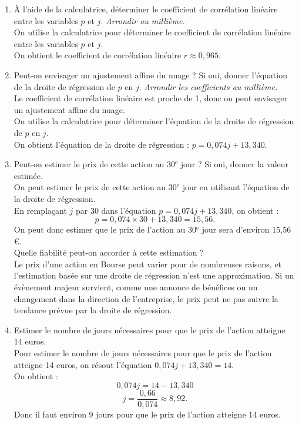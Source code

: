 \documentclass[a4paper,11pt,exos]{nsi}
\begin{document}
\begin{enumerate}
    \item À l'aide de la calculatrice, déterminer le coefficient de corrélation linéaire entre les variables $p$ et $j$. \textit{Arrondir au millième.}\\[.5em]
    \textcolor{UGLiBlue}{
        On utilise la calculatrice pour déterminer le coefficient de corrélation linéaire entre les variables $p$ et $j$.\\
        On obtient le coefficient de corrélation linéaire $r\approx 0,965$.
    }
    \item Peut-on envisager un ajustement affine du nuage ? Si oui, donner l'équation de la droite de régression de $p$ en $j$. \textit{Arrondir les coefficients au millième.}\\[.5em]
    \textcolor{UGLiBlue}{
        Le coefficient de corrélation linéaire est proche de 1, donc on peut envisager un ajustement affine du nuage.\\
        On utilise la calculatrice pour déterminer l'équation de la droite de régression de $p$ en $j$.\\
        On obtient l'équation de la droite de régression : $p = 0,074j + 13,340$.
    }
    \item Peut-on estimer le prix de cette action au 30$^{\text{e}}$ jour ? Si oui, donner la valeur estimée.\\[.5em]
    \textcolor{UGLiBlue}{
        On peut estimer le prix de cette action au 30$^{\text{e}}$ jour en utilisant l'équation de la droite de régression.\\
        En remplaçant $j$ par 30 dans l'équation $p = 0,074j + 13,340$, on obtient :
        \[p = 0,074 \times 30 + 13,340 = 15,56.\]
        On peut donc estimer que le prix de l'action au 30$^{\text{e}}$ jour sera d'environ 15,56 €.
    }\\

    Quelle fiabilité peut-on accorder à cette estimation ?\\[.5em]
    \textcolor{UGLiBlue}{
        Le prix d'une action en Bourse peut varier pour de nombreuses raisons, et l'estimation basée sur une droite de régression n'est une approximation. Si un évènement majeur survient, comme une annonce de bénéfices ou un changement dans la direction de l'entreprise, le prix peut ne pas suivre la tendance prévue par la droite de régression.\\
    }
    \item Estimer le nombre de jours nécessaires pour que le prix de l'action atteigne 14 euros.\\[.5em]
    \textcolor{UGLiBlue}{
        Pour estimer le nombre de jours nécessaires pour que le prix de l'action atteigne 14 euros, on résout l'équation $0,074j + 13,340 = 14$.\\
        On obtient :
        \[0,074j = 14 - 13,340\]
        \[j = \dfrac{0,66}{0,074} \approx 8,92.\]
        Donc il faut environ 9 jours pour que le prix de l'action atteigne 14 euros.
    }
\end{enumerate}
\end{document}
